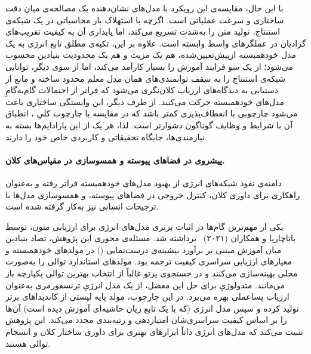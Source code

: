 با این حال، مقایسه‌ی این رویکرد با مدل‌های  نشان‌دهنده یک مصالحه‌ی میان دقت ساختاری و سرعت عملیاتی است. اگرچه  با استهلاک بار محاسباتی در یک شبکه‌ی استنتاج، تولید متن را به‌شدت تسریع می‌کند، اما پایداری آن به کیفیت تقریب‌های گرادیان در عملگرهای واسط وابسته است. علاوه بر این، تکیه‌ی مطلق تابع انرژی به یک مدل خودهمبسته ازپیش‌تعیین‌شده، هم یک مزیت و هم یک محدودیت بنیادین محسوب می‌شود؛ از یک سو فرایند آموزش را بسیار کارآمد می‌کند، اما از سوی دیگر، توانایی شبکه‌ی استنتاج را به سقف توانمندی‌های همان مدل معلم محدود ساخته و مانع از دستیابی به دیدگاه‌های ارزیاب کلان‌نگری می‌شود که فراتر از احتمالات گام‌به‌گامِ مدل‌های خودهمبسته حرکت می‌کنند. از طرف دیگر، این وابستگی ساختاری باعث می‌شود  چارچوبی با انعطاف‌پذیری کمتر باشد که در مقایسه با چارچوب کلیِ ، انطباق آن با شرایط و وظایف گوناگون دشوارتر است. لذا، هر یک از این پارادایم‌ها بسته به نیازمندی‌ها، جایگاه تحقیقاتی و کاربردی خاص خود را دارند.


\paragraph{پیشروی در فضاهای پیوسته و همسوسازی در مقیاس‌های کلان.}

دامنه‌ی نفوذ شبکه‌های انرژی از بهبود مدل‌های خودهمبسته فراتر رفته و به‌عنوان راهکاری برای داوری کلان، کنترل خروجی در فضاهای پیوسته، و همسوسازی مدل‌ها با ترجیحات انسانی نیز به‌کار گرفته شده است. 

یکی از مهم‌ترین گام‌ها در اثبات برتری مدل‌های انرژی برای ارزیابی متون، توسط باتاچاریا و همکاران (۲۰۲۱)~\cite{bhattacharyya2021reranking} برداشته شد. مسئله‌ی محوری این پژوهش، تضاد بنیادین میان آموزش مبتنی بر برآورد بیشینه‌ی درست‌نمایی () در مولدهای خودهمبسته و معیارهای ارزیابی سراسری کیفیت ترجمه بود. مولدهای استاندارد توالی را به‌صورت محلی بهینه‌سازی می‌کنند و در جستجوی پرتو غالباً از انتخاب بهترین توالی یکپارچه باز می‌مانند. متدولوژیِ  برای حل این معضل، از یک مدل انرژیِ ترنسفورمری به‌عنوان ارزیاب پساعملی بهره می‌برد. در این چارچوب، مولد پایه لیستی از کاندیداهای برتر تولید کرده و سپس مدل انرژی (که با یک تابع زیان حاشیه‌ای آموزش دیده است) آن‌ها را بر اساس کیفیت سراسری‌شان امتیازدهی و رتبه‌بندی مجدد می‌کند. این پژوهش تثبیت می‌کند که مدل‌های انرژی ذاتاً ابزارهای بهتری برای داوری ساختار کلان و انسجام توالی هستند.

